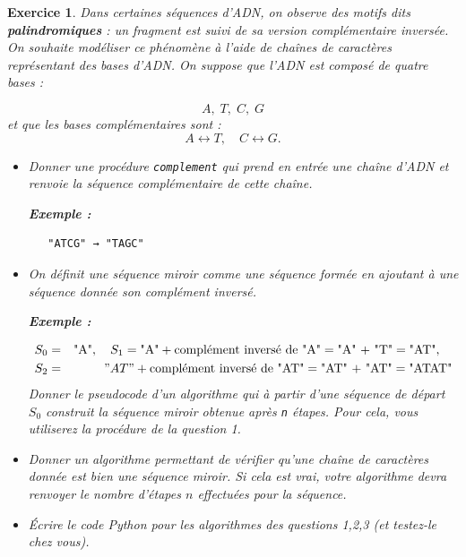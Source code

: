\documentclass[11pt]{article}
\newtheorem{exercice}{Exercice}[section]
\begin{document}
\begin{exercice}
Dans certaines séquences d'ADN, on observe des motifs dits \textbf{palindromiques} :
un fragment est suivi de sa version complémentaire inversée.  
On souhaite modéliser ce phénomène à l’aide de chaînes de caractères représentant des bases d’ADN.
On suppose  que l’ADN est composé de quatre bases :

\[
A, \; T, \; C, \; G
\]
et que les bases complémentaires sont :
\[
A \leftrightarrow T, \quad C \leftrightarrow G.
\]

\begin{itemize}
\item[1.]  Donner une procédure \texttt{complement} qui prend en entrée  une chaîne d'ADN et renvoie la séquence complémentaire de cette chaîne. 

\vspace{0.5 cm}


\textbf{Exemple :}
\vspace{0.5 cm}


\begin{center}
\begin{verbatim}
   "ATCG" → "TAGC"
\end{verbatim}
\end{center}

\vspace{0.5 cm}


\item[2.]  On définit une séquence miroir comme une séquence formée en ajoutant à une séquence donnée
son complément inversé.

\vspace{0.5 cm}

\textbf{Exemple :}

\begin{eqnarray*}
S_0 &= &\text{"A"}, \quad S_1 = \text{"A"} + \text{complément inversé de "A"} = \text{"A" + "T"} = \text{"AT"}, \quad \\
S_2 &=& "AT" + \text{complément inversé de "AT"} = \text{"AT" + "AT"} = \text{"ATAT"}
\end{eqnarray*}
Donner le pseudocode  d'un algorithme  qui à  partir d'une séquence de départ $S_0$ construit la séquence miroir obtenue après \texttt{n} étapes.
Pour cela, vous utiliserez la procédure de la question 1. 
\item[3.] Donner un algorithme permettant de vérifier qu'une chaîne de caractères donnée est bien une séquence miroir. Si cela est vrai, votre algorithme devra renvoyer le nombre d'étapes $n$ effectuées pour 
la séquence. 
\item[4.] \'Ecrire le code Python pour les algorithmes des questions 1,2,3  (et testez-le chez vous). 
\end{itemize}



\end{exercice}
\end{document}
